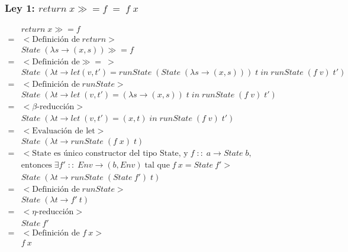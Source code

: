 \documentclass[a4paper]{report}
\newcommand{\bind}{\gg\!\!=}
\begin{document}
\subsubsection*{Ley 1: $return \; x \bind f \; = \; f \; x$}
\begin{align*}
    & return \; x \bind f \\
    = & < \text{Definici\'on de} \; return > \\
    & State \; (\lambda s \to (x,s)) \bind f \\
    = & < \text{Definici\'on de} \bind \: > \\
    & State \; (\lambda t \to 
      let (v,t') = runState \; (State \; (\lambda s \to (x,s))) \; t \;
      in \; runState \; (f \; v) \; t') \\
    = & < \text{Definici\'on de} \; runState > \\
    & State \; (\lambda t \to
      let \; (v,t') = (\lambda s \to (x,s)) \; t \;
      in \; runState \; (f \; v) \; t') \\
    = & < \beta\text{-reducci\'on} > \\
    & State \; (\lambda t \to
      let \; (v,t') = (x,t) \; in \; runState \; (f \; v) \; t') \\
    = & < \text{Evaluaci\'on de let} > \\
    & State \; (\lambda t \to runState \; (f \; x) \; t) \\
    = & < \text{State es \'unico constructor del tipo State,
         y} \; f \; :: \; a \to State \; b, \\
    & \text{entonces} \;\exists f' \; :: \; Env \to (b,Env)\;
        \text{tal que} \; f\: x = State\: f' > \\
    & State \; (\lambda t \to runState \; (State \: f') \; t) \\
    = & < \text{Definici\'on de} \; runState > \\
    & State \; (\lambda t \to f' \: t) \\
    = & < \eta \text{-reducci\'on} > \\
    & State \: f' \\
    = & < \text{Definici\'on de } f \: x > \\
    & f \: x
\end{align*}
\end{document}
